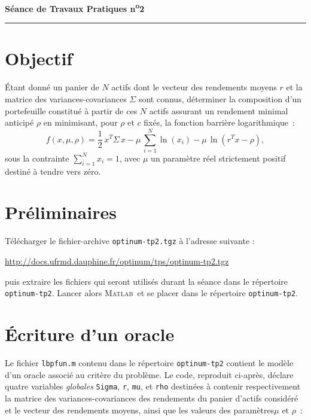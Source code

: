 \documentclass[10pt,a4paper,fleqn]{report}
\makeatletter
\def\cleardoublepage{\clearpage\if@twoside\ifodd\c@page\else\hbox{}\thispagestyle{empty}\newpage\fi\fi}
\newcommand{\matlab}{\textsc{Matlab}}
\renewcommand{\tt}{\texttt}
\makeatother
\begin{document}
\cleardoublepage



\begin{center}

\textbf{\huge S\'{e}ance de Travaux Pratiques  n\textsuperscript{o}2}

\smallskip

\rule{10cm}{0.4pt}

\end{center}


\section*{Objectif} 
\'Etant donn\'e un panier de $N$ actifs dont le vecteur des rendements moyens $r$ et la matrice des variances-covariances $\Sigma$ sont connus, d\'eterminer la composition d'un portefeuille constitu\'e \`a partir de ces $N$ actifs assurant un rendement minimal anticip\'e $\rho$ en minimisant, pour $\rho$ et $c$ fix\'es, la fonction barri\`ere logarithmique~:
\[
f(x,\mu,\rho)=\frac{1}{2}\,x^T\Sigma\,x-\mu\,\sum_{i=1}^N\ln(x_i)-\mu\,\ln\left(r^Tx-\rho\right),
\]
sous la contrainte $\sum_{i=1}^N x_i=1$, avec $\mu$ un param\`etre r\'eel strictement positif destin\'e \`a tendre vers z\'ero.


\section{Pr\'{e}liminaires}
T\'{e}l\'{e}charger le fichier-archive \tt{optinum-tp2.tgz} \`{a} l'adresse suivante :

\centerline{\url{http://docs.ufrmd.dauphine.fr/optinum/tps/optinum-tp2.tgz}}
puis extraire les fichiers qui seront utilis\'{e}s durant la s\'{e}ance dans le r\'{e}pertoire
\tt{optinum-tp2}. Lancer alors \matlab\ et se placer dans le r\'{e}pertoire \tt{optinum-tp2}.

\section{\'Ecriture d'un oracle}

Le fichier \texttt{lbpfun.m} contenu dans le répertoire \tt{optinum-tp2} contient le modèle d'un oracle associé au critère du problème. Le code, reproduit ci-après,  déclare quatre variables \textit{globales} \tt{Sigma}, \tt r, \tt{mu}, et \tt{rho} destin\'ees \`a contenir respectivement la matrice des variances-covariances des rendements du panier d'actifs consid\'er\'e et le vecteur des rendements moyens, ainsi que les valeurs des paramètres$\mu$ et $\rho$~:
\end{document}
